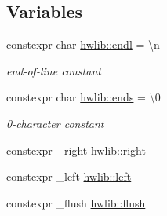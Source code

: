 \subsection*{Variables}
\begin{DoxyCompactItemize}
\item 
\mbox{\label{namespacehwlib_a89ce110cc897f61657f1edca18e4cef7}} 
constexpr char \hyperlink{namespacehwlib_a89ce110cc897f61657f1edca18e4cef7}{hwlib\+::endl} = \textquotesingle{}\textbackslash{}n\textquotesingle{}
\begin{DoxyCompactList}\small\item\em end-\/of-\/line constant \end{DoxyCompactList}\item 
\mbox{\label{namespacehwlib_ac708935d0fc9beb71bb55a7c35e69a16}} 
constexpr char \hyperlink{namespacehwlib_ac708935d0fc9beb71bb55a7c35e69a16}{hwlib\+::ends} = \textquotesingle{}\textbackslash{}0\textquotesingle{}
\begin{DoxyCompactList}\small\item\em 0-\/character constant \end{DoxyCompactList}\item 
constexpr \+\_\+right \hyperlink{namespacehwlib_a26a6aead1d4dc1a990ab77bf2b730740}{hwlib\+::right}
\item 
constexpr \+\_\+left \hyperlink{namespacehwlib_a7d9a4ef3e66da75048c5b3e67cf401d8}{hwlib\+::left}
\item 
constexpr \+\_\+flush \hyperlink{namespacehwlib_a648fe94ca9899747a632c23f97007732}{hwlib\+::flush}
\end{DoxyCompactItemize}
